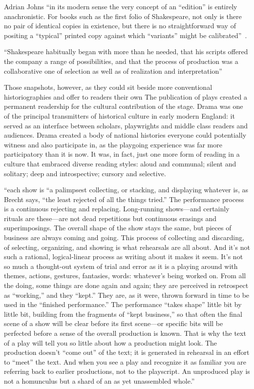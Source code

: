 Adrian Johns ``in its modern sense the very concept of an ``edition'' is entirely anachronistic. For books such as the first folio of Shakespeare, not only is there no pair of identical copies in existence, but there is no straightforward way of positing a ``typical'' printed copy against which ``variants'' might be calibrated''~\cite[91]{johns_nature_1998}.

``Shakespeare habitually began with more than he needed, that his scripts offered the company a range of possibilities, and that the process of production was a collaborative one of selection as well as of realization and interpretation''~\cite[7]{orgel_authentic_1988}

Those snapshots, however, 
as they could sit beside more conventional historiographies and offer to readers their own 
The publication of plays created a permanent readership for the cultural contribution of the stage. 
Drama was one of the principal transmitters of historical culture in early modern England: it served as an interface between scholars, playwrights and middle class readers and audiences. Drama created a body of national histories everyone could potentially witness and also participate in, as the playgoing experience was far more participatory than it is now. It was, in fact, just one more form of reading in a culture that embraced diverse reading styles: aloud and communal; silent and solitary; deep and introspective; cursory and selective.

``each show is ``a palimpsest collecting, or stacking, and displaying whatever is, as Brecht says, ``the least rejected of all the things tried.'' The performance process is a continuous rejecting and replacing. Long-running shows---and certainly rituals are these---are not dead repetitions but continuous erasings and superimposings. The overall shape of the show stays the same, but pieces of business are always coming and going. This process of collecting and discarding, of selecting, organizing, and showing is what rehearsals are all about. And it's not such a rational, logical-linear process as writing about it makes it seem. It's not so much a thought-out system of trial and error as it is a playing around with themes, actions, gestures, fantasies, words: whatever's being worked on. From all the doing, some things are done again and again; they are perceived in retrospect as ``working,'' and they ``kept.'' They are, as it were, thrown forward in time to be used in the ``finished performance.'' The performance ``takes shape'' little bit by little bit, building from the fragments of ``kept business,'' so that often the final scene of a show will be clear before its first scene---or specific bits will be perfected before a sense of the overall production is known. That is why the text of a play will tell you so little about how a production might look. The production doesn't ``come out'' of the text; it is generated in rehearsal in an effort to ``meet'' the text. And when you see a play and recognize it as familiar you are referring back to earlier productions, not to the playscript. An unproduced play is not a homunculus but a shard of an as yet unassembled whole.''~\cite[120]{schechner_between_2011}

